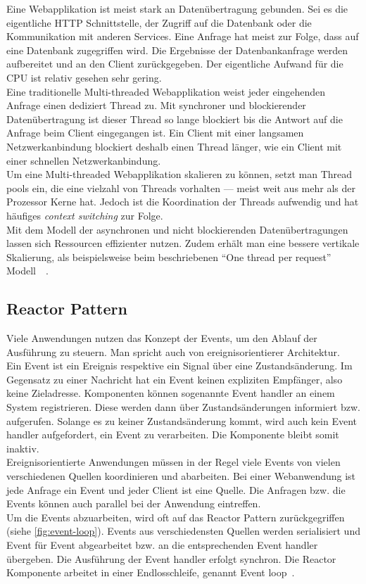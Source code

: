 \pagebreak

Eine Webapplikation ist meist stark an Datenübertragung gebunden. Sei es die eigentliche HTTP Schnittstelle, der Zugriff auf die Datenbank oder die Kommunikation mit anderen Services. Eine Anfrage hat meist zur Folge, dass auf eine Datenbank zugegriffen wird. Die Ergebnisse der Datenbankanfrage werden aufbereitet und an den Client zurückgegeben. Der eigentliche Aufwand für die CPU ist relativ gesehen sehr gering.\\
Eine traditionelle Multi-threaded Webapplikation weist jeder eingehenden Anfrage einen dediziert Thread zu. Mit synchroner und blockierender Datenübertragung ist dieser Thread so lange blockiert bis die Antwort auf die Anfrage beim Client eingegangen ist. Ein Client mit einer langsamen Netzwerkanbindung blockiert deshalb einen Thread länger, wie ein Client mit einer schnellen Netzwerkanbindung.\\
Um eine Multi-threaded Webapplikation skalieren zu können, setzt man Thread pools ein, die eine vielzahl von Threads vorhalten --- meist weit aus mehr als der Prozessor Kerne hat. Jedoch ist die Koordination der Threads aufwendig und hat häufiges \textit{context switching} zur Folge.\\
Mit dem Modell der asynchronen und nicht blockierenden Datenübertragungen lassen sich Ressourcen effizienter nutzen. Zudem erhält man eine bessere vertikale Skalierung, als beispielsweise beim beschriebenen \enquote{One thread per request} Modell~\cite[S.~171]{butcher_seven_2014}~\cite[S.~76]{erb_concurrent_2012}.

\pagebreak

\subsection{Reactor Pattern}
Viele Anwendungen nutzen das Konzept der Events, um den Ablauf der Ausführung zu steuern. Man spricht auch von ereignisorientierer Architektur.\\ 
Ein Event ist ein Ereignis respektive ein Signal über eine Zustandsänderung. Im Gegensatz zu einer Nachricht hat ein Event keinen expliziten Empfänger, also keine Zieladresse. Komponenten können sogenannte Event handler an einem System registrieren. Diese werden dann über Zustandsänderungen informiert bzw. aufgerufen. Solange es zu keiner Zustandsänderung kommt, wird auch kein Event handler aufgefordert, ein Event zu verarbeiten. Die Komponente bleibt somit inaktiv.\\
Ereignisorientierte Anwendungen müssen in der Regel viele Events von vielen verschiedenen Quellen koordinieren und abarbeiten. Bei einer Webanwendung ist jede Anfrage ein Event und jeder Client ist eine Quelle. Die Anfragen bzw. die Events können auch parallel bei der Anwendung eintreffen.\\
Um die Events abzuarbeiten, wird oft auf das Reactor Pattern zurückgegriffen (siehe \autoref{fig:event-loop}). Events aus verschiedensten Quellen werden serialisiert und Event für Event abgearbeitet bzw. an die entsprechenden Event handler übergeben. Die Ausführung der Event handler erfolgt synchron. Die Reactor Komponente arbeitet in einer Endlosschleife, genannt Event loop~\cite[S.~260~-~S.~261]{buschmann_pattern_2011}.

